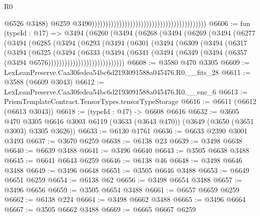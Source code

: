\begin{lexlean}{R0}
\begin{coremodule}
                                                                                          @6526
                                                                                          @3488)
                                                                                        @6259
                                                                                        @3490))))))))))))))))))))))))))))))))))))))))))
@6606 := fun (typeId : @17) =>
  @3494
    (@6260
      (@3494
        (@6268
          (@3494
            (@6269
              (@3494
                (@6277
                  (@3494
                    (@6285
                      (@3494
                        (@6293
                          (@3494
                            (@6301
                              (@3494
                                (@6309
                                  (@3494
                                    (@6317
                                      (@3494
                                        (@6325
                                          (@3494
                                            (@6333
                                              (@3494
                                                (@6341
                                                  (@3494
                                                    (@6349
                                                      (@3494
                                                        (@6357
                                                          (@3494 @6576))))))))))))))))))))))))))))
@6608 := @3580 @470 @3305
@6609 := LexLeanPreserve.Caa30fedea54bc6d2193091588a045476.R0.__fits_28
@6611 := @3588 (@6609 @3043)
@6612 := LexLeanPreserve.Caa30fedea54bc6d2193091588a045476.R0.__enc_6
@6613 := PrismTemplateContract.TensorTypes.tensorTypeStorage
@6616 := @6611 (@6612 (@6613 @3043))
@6618 := (typeId : @17) -> @6608 @6616
@6632 := @3605
    @470
    @3305
    @6616
    @3003
    @6119
    (@3633 (@3643 @470))
    (@3649 (@3650 (@3651 @3003) @3305 @3626))
@6633 := @6130 @1761
@6636 := @6633 @2390 @3001 @3493
@6637 := @3670 @6259
@6638 := @6138 @23
@6639 := @3498 @6638
@6640 := @6639 @3488
@6641 := @3496 @6640
@6643 := @3505 @6638 @3488
@6645 := @6641 @6643 @6259
@6646 := @6138 @46
@6648 := @3498 @6646 @3488
@6649 := @3496 @6648
@6651 := @3505 @6646 @3488
@6653 := @6649 @6651 @6259
@6654 := @6138 @62
@6656 := @3498 @6654 @3488
@6657 := @3496 @6656
@6659 := @3505 @6654 @3488
@6661 := @6657 @6659 @6259
@6662 := @6138 @224
@6664 := @3498 @6662 @3488
@6665 := @3496 @6664
@6667 := @3505 @6662 @3488
@6669 := @6665 @6667 @6259

\end{coremodule}
\end{lexlean}
